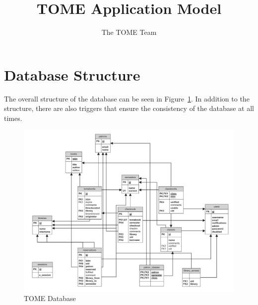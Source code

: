 \documentclass[12pt,titlepage]{article}
\author{The TOME Team}
\title{\textbf{TOME Application Model}}
\begin{document}
\maketitle
\tableofcontents
\listoffigures
\newpage
\section{Database Structure}
The overall structure of the database can be seen in Figure~\ref{tomedb}.  In addition to the structure, there are also triggers that ensure the consistency of the database at all times.
\begin{figure}[h]
	\includegraphics[width=\textwidth]{tomedb}
	\caption{TOME Database}
	\label{tomedb}
\end{figure}
\end{document}
